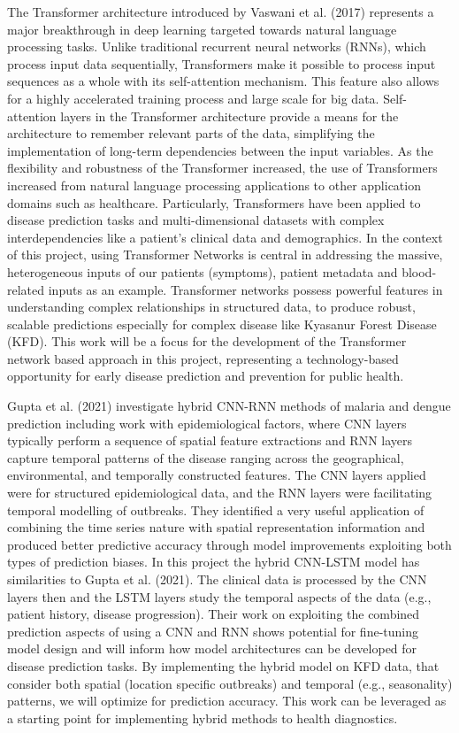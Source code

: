 \documentclass[conference]{IEEEtran}
\begin{document}
The Transformer architecture introduced by Vaswani et al. (2017) represents a major breakthrough in deep learning targeted towards natural language processing tasks. Unlike traditional recurrent neural networks (RNNs), which process input data sequentially, Transformers make it possible to process input sequences as a whole with its self-attention mechanism. This feature also allows for a highly accelerated training process and large scale for big data. Self-attention layers in the Transformer architecture provide a means for the architecture to remember relevant parts of the data, simplifying the implementation of long-term dependencies between the input variables. As the flexibility and robustness of the Transformer increased, the use of Transformers increased from natural language processing applications to other application domains such as healthcare. Particularly, Transformers have been applied to disease prediction tasks and multi-dimensional datasets with complex interdependencies like a patient's clinical data and demographics. In the context of this project, using Transformer Networks is central in addressing the massive, heterogeneous inputs of our patients (symptoms), patient metadata and blood-related inputs as an example. Transformer networks possess powerful features in understanding complex relationships in structured data, to produce robust, scalable predictions especially for complex disease like Kyasanur Forest Disease (KFD). This work will be a focus for the development of the Transformer network based approach in this project, representing a technology-based opportunity for early disease prediction and prevention for public health.
\par\vspace{1em} 
Gupta et al. (2021) investigate hybrid CNN-RNN methods of malaria and dengue prediction including work with epidemiological factors, where CNN layers typically perform a sequence of spatial feature extractions and RNN layers capture temporal patterns of the disease ranging across the geographical, environmental, and temporally constructed features. The CNN layers applied were for structured epidemiological data, and the RNN layers were facilitating temporal modelling of outbreaks. They identified a very useful application of combining the time series nature with spatial representation information and produced better predictive accuracy through model improvements exploiting both types of prediction biases. In this project the hybrid CNN-LSTM model has similarities to Gupta et al. (2021). The clinical data is processed by the CNN layers then and the LSTM layers study the temporal aspects of the data (e.g., patient history, disease progression). Their work on exploiting the combined prediction aspects of using a CNN and RNN shows potential for fine-tuning model design and will inform how model architectures can be developed for disease prediction tasks. By implementing the hybrid model on KFD data, that consider both spatial (location specific outbreaks) and temporal (e.g., seasonality) patterns, we will optimize for prediction accuracy. This work can be leveraged as a starting point for implementing hybrid methods to health diagnostics.
\end{document}
